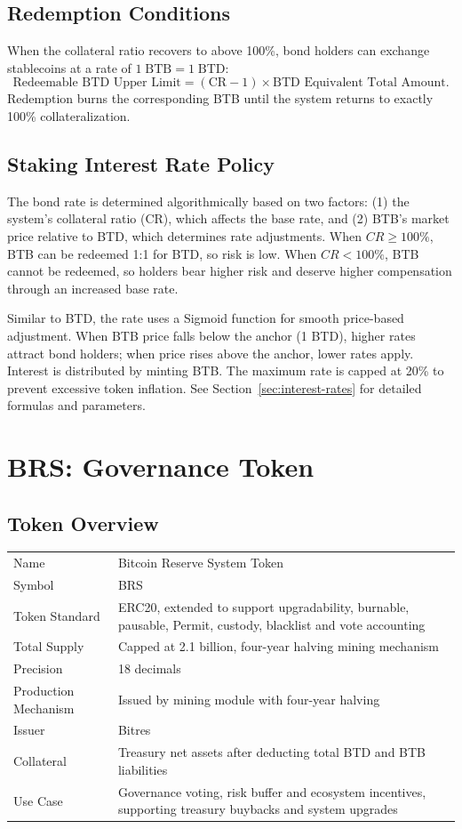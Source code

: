 \documentclass{article}
\begin{document}
\subsection{Redemption Conditions}
When the collateral ratio recovers to above 100\%, bond holders can exchange stablecoins at a rate of $1 \;\text{BTB} =1 \;\text{BTD}$:
\begin{equation}
\text{Redeemable BTD Upper Limit} = (\text{CR}-1) \times \text{BTD Equivalent Total Amount}.
\end{equation}
Redemption burns the corresponding BTB until the system returns to exactly 100\% collateralization.

\subsection{Staking Interest Rate Policy}
The bond rate is determined algorithmically based on two factors: (1) the system's collateral ratio (CR), which affects the base rate, and (2) BTB's market price relative to BTD, which determines rate adjustments. When $CR \geq 100\%$, BTB can be redeemed 1:1 for BTD, so risk is low. When $CR < 100\%$, BTB cannot be redeemed, so holders bear higher risk and deserve higher compensation through an increased base rate.

Similar to BTD, the rate uses a Sigmoid function for smooth price-based adjustment. When BTB price falls below the anchor (1 BTD), higher rates attract bond holders; when price rises above the anchor, lower rates apply. Interest is distributed by minting BTB. The maximum rate is capped at 20\% to prevent excessive token inflation. See Section~\ref{sec:interest-rates} for detailed formulas and parameters.

\section{BRS: Governance Token}
\subsection{Token Overview}
\begin{tabularx}{\textwidth}{l X}
\toprule
Name & Bitcoin Reserve System Token \\
Symbol & BRS \\
Token Standard & ERC20, extended to support upgradability, burnable, pausable, Permit, custody, blacklist and vote accounting \\
Total Supply & Capped at 2.1 billion, four-year halving mining mechanism \\
Precision & 18 decimals \\
Production Mechanism & Issued by mining module with four-year halving \\
Issuer & Bitres \\
Collateral & Treasury net assets after deducting total BTD and BTB liabilities \\
Use Case & Governance voting, risk buffer and ecosystem incentives, supporting treasury buybacks and system upgrades \\
\bottomrule
\end{tabularx}
\end{document}
